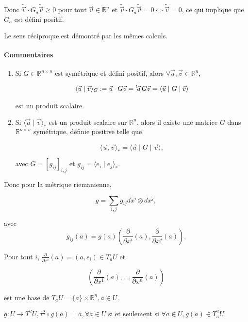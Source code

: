 \documentclass[french]{article}
\theoremstyle{definition}
\newcommand{\R}{\mathbb{R}}
\begin{document}
Donc \(\tilde{\vec{v}} \cdot G_a \tilde{\vec{v}} \geq 0\) pour tout \(\vec{v} \in \mathbb{R}^n\) et \(\tilde{\vec{v}} \cdot G_a \tilde{\vec{v}} = 0 \iff \tilde{\vec{v}} = 0\), ce qui implique que \(G_a\) est défini positif.

Le sens réciproque est démontré par les mêmes calculs.

\paragraph{Commentaires}

\begin{enumerate}
  \item Si \(G \in \R ^{n\times n}\) est symétrique et défini positif, alors \(\forall \vec{u}, \vec{v} \in \mathbb{R}^n\),

  \begin{gather*}
    \langle \vec{u} \mid \vec{v} \rangle _{G} := \vec{u} \cdot G \vec{v} = \prescript{t}{}\! \vec{u} \, G \vec{v} = \langle \vec{u} \mid G \mid \vec{v} \rangle
  \end{gather*}

  est un produit scalaire.

  \item Si \(\langle \vec{u} \mid \vec{v} \rangle _{*} \) est un produit scalaire sur \(\mathbb{R}^n\), alors il existe une matrice \(G\) dans \(\mathbb{R} ^{n\times n}\) symétrique, définie positive telle que

  \[\langle \vec{u},\vec{v} \rangle _{*} = \langle \vec{u} \mid G \mid \vec{v} \rangle,  \]

  avec \(G = [g _{ij}] _{i,j}\) et \(g _{ij} = \langle e _{i} \mid e _{j} \rangle _{*} \).
\end{enumerate}

Donc pour la métrique riemanienne,

\[g = \sum_{i,j} g _{ij} d x^{i} \otimes d x^{j}, \]

avec \[g _{ij}(a) = g(a) \left(\frac{\partial  }{\partial x ^{i}}(a), \frac{\partial  }{\partial x ^{j}}(a)\right).\]

Pour tout \(i\), \(\frac{\partial  }{\partial x ^{i}}(a) = (a, e_i) \in T_a U\) et

\[\left(\frac{\partial  }{\partial x ^{1}}(a), \dots, \frac{\partial  }{\partial x ^{n}}(a)\right)\]

est une base de \(T_a U = \{ a \} \times \mathbb{R}^n, a \in U\).

\(g : U \longrightarrow T ^2 U, \tau ^2 \circ g (a) = a, \forall a \in U\) si et seulement si \(\forall a \in U, g(a) \in T^2_a U\).
\end{document}
